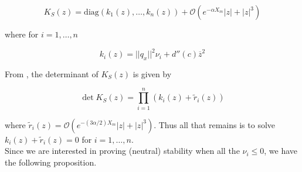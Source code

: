 \documentclass[12pt]{article}
\begin{document}
\begin{equation}
K_S(z) = \text{diag}(k_1(z), \dots, k_n(z)) + \mathcal{O}(e^{-\alpha X_m}|z| + |z|^3)
\end{equation}

where for $i = 1, \dots, n$

\begin{equation}
k_i(z) = ||q_x||^2 \nu_i + d''(c) \overline{z}^2
\end{equation}

From \cite{Ipsen2008}, the determinant of $K_S(z)$ is given by

\begin{equation}\label{detK}
\det K_S(z) = \prod_{i = 1}^n (k_i(z) + \tilde{r}_i(z))
\end{equation}

where $\tilde{r}_i(z) = \mathcal{O}(e^{-(3 \alpha/2) X_m}|z| + |z|^3)$. Thus all that remains is to solve $k_i(z) + \tilde{r}_i(z) = 0$ for $i = 1, \dots, n$.\\

Since we are interested in proving (neutral) stability when all the $\nu_i \leq 0$, we have the following proposition.

\end{document}
